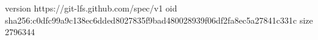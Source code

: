 version https://git-lfs.github.com/spec/v1
oid sha256:c0dfc99a9c138ec6dded8027835f9bad480028939f06df2fa8ec5a27841c331c
size 2796344
